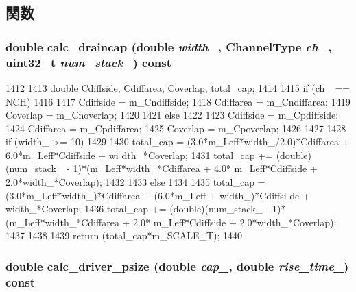 \subsection{関数}
\hypertarget{classTechParameter_ad0fce6ad14f629d961ca0b6f2a9abe39}{
\subsubsection[{calc\_\-draincap}]{\setlength{\rightskip}{0pt plus 5cm}double calc\_\-draincap (double {\em width\_\-}, \/  {\bf ChannelType} {\em ch\_\-}, \/  {\bf uint32\_\-t} {\em num\_\-stack\_\-}) const}}
\label{classTechParameter_ad0fce6ad14f629d961ca0b6f2a9abe39}



\begin{DoxyCode}
1412 {
1413     double Cdiffside, Cdiffarea, Coverlap, total_cap;
1414 
1415     if (ch_ == NCH)
1416     {
1417         Cdiffside = m_Cndiffside;
1418         Cdiffarea = m_Cndiffarea;
1419         Coverlap = m_Cnoverlap;
1420     }
1421     else
1422     {
1423         Cdiffside = m_Cpdiffside;
1424         Cdiffarea = m_Cpdiffarea;
1425         Coverlap = m_Cpoverlap;
1426     }
1427 
1428     if (width_ >= 10)
1429     {
1430         total_cap = (3.0*m_Leff*width_/2.0)*Cdiffarea + 6.0*m_Leff*Cdiffside + wi
      dth_*Coverlap;
1431         total_cap += (double)(num_stack_ - 1)*(m_Leff*width_*Cdiffarea + 4.0*
      m_Leff*Cdiffside + 2.0*width_*Coverlap);
1432     }
1433     else
1434     {
1435         total_cap = (3.0*m_Leff*width_)*Cdiffarea + (6.0*m_Leff + width_)*Cdiffsi
      de + width_*Coverlap;
1436         total_cap += (double)(num_stack_ - 1)*(m_Leff*width_*Cdiffarea + 2.0*
      m_Leff*Cdiffside + 2.0*width_*Coverlap);
1437     }
1438 
1439     return (total_cap*m_SCALE_T);
1440 }
\end{DoxyCode}
\hypertarget{classTechParameter_aa9f767e191585de42f46eb4cf54a31c8}{
\subsubsection[{calc\_\-driver\_\-psize}]{\setlength{\rightskip}{0pt plus 5cm}double calc\_\-driver\_\-psize (double {\em cap\_\-}, \/  double {\em rise\_\-time\_\-}) const}}
\label{classTechParameter_aa9f767e191585de42f46eb4cf54a31c8}



